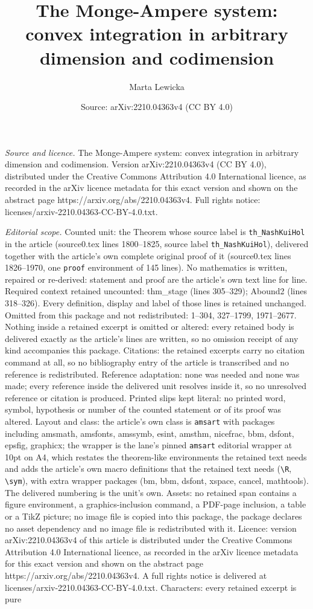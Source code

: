 \documentclass[10pt,a4paper]{amsart}
\title[The Monge-Ampere system: convex integration in arbitrary dim]{The Monge-Ampere system: convex integration in arbitrary dimension and codimension}
\author{Marta Lewicka}
\date{Source: arXiv:2210.04363v4 (CC BY 4.0)}
\begin{document}
\maketitle

\noindent\emph{Source and licence.} The Monge-Ampere system: convex integration in arbitrary dimension and codimension. Version arXiv:2210.04363v4 (CC BY 4.0), distributed under the Creative Commons Attribution 4.0 International licence, as recorded in the arXiv licence metadata for this exact version and shown on the abstract page https://arxiv.org/abs/2210.04363v4. Full rights notice: licenses/arxiv-2210.04363-CC-BY-4.0.txt.\par\smallskip

\noindent\textit{Editorial scope.} Counted unit: the Theorem whose source label is \texttt{th\_NashKuiHol} in the article (source0.tex lines 1800--1825, source label \texttt{th\_NashKuiHol}), delivered together with the article's own complete original proof of it (source0.tex lines 1826--1970, one \texttt{proof} environment of 145 lines). No mathematics is written, repaired or re-derived: statement and proof are the article's own text line for line. Required context retained uncounted: thm\_stage (lines 305--329); Abound2 (lines 318--326). Every definition, display and label of those lines is retained unchanged. Omitted from this package and not redistributed: 1--304, 327--1799, 1971--2677. Nothing inside a retained excerpt is omitted or altered: every retained body is delivered exactly as the article's lines are written, so no omission receipt of any kind accompanies this package. Citations: the retained excerpts carry no citation command at all, so no bibliography entry of the article is transcribed and no reference is redistributed. Reference adaptation: none was needed and none was made; every reference inside the delivered unit resolves inside it, so no unresolved reference or citation is produced. Printed slips kept literal: no printed word, symbol, hypothesis or number of the counted statement or of its proof was altered. Layout and class: the article's own class is \texttt{amsart} with packages including amsmath, amsfonts, amssymb, esint, amsthm, nicefrac, bbm, dsfont, epsfig, graphicx; the wrapper is the lane's pinned \texttt{amsart} editorial wrapper at 10pt on A4, which restates the theorem-like environments the retained text needs and adds the article's own macro definitions that the retained text needs (\texttt{\textbackslash R}, \texttt{\textbackslash sym}), with extra wrapper packages (bm, bbm, dsfont, xspace, cancel, mathtools). The delivered numbering is the unit's own. Assets: no retained span contains a figure environment, a graphics-inclusion command, a PDF-page inclusion, a table or a TikZ picture; no image file is copied into this package, the package declares no asset dependency and no image file is redistributed with it. Licence: version arXiv:2210.04363v4 of this article is distributed under the Creative Commons Attribution 4.0 International licence, as recorded in the arXiv licence metadata for this exact version and shown on the abstract page https://arxiv.org/abs/2210.04363v4. A full rights notice is delivered at licenses/arxiv-2210.04363-CC-BY-4.0.txt. Characters: every retained excerpt is pure 
\end{document}
